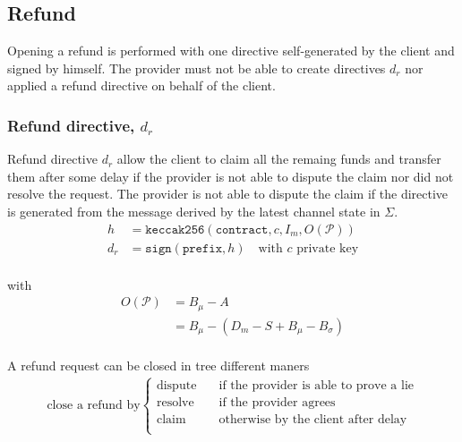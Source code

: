 \documentclass{llncs}
\begin{document}
\subsection{Refund} Opening a refund is performed with one directive self-generated by the client and signed by himself. The provider must not be able to create directives $d_r$ nor applied a refund directive on behalf of the client.

\subsubsection{Refund directive, $d_r$} Refund directive $d_r$ allow the client to claim all the remaing funds and transfer them after some delay if the provider is not able to dispute the claim nor did not resolve the request. The provider is not able to dispute the claim if the directive is generated from the message derived by the latest channel state in $\Sigma$.
\begin{equation*}
\begin{split}
    h &= \texttt{keccak256}(\texttt{contract},c,I_m,O(\mathcal{P})) \\
    d_r &= \texttt{sign}(\texttt{prefix}, h) \quad \text{with $c$ private key} \\
\end{split}
\end{equation*}

with
\begin{equation*}
\begin{split}
    O(\mathcal{P}) &= B_\mu - A \\
    &= B_\mu - (D_m - S + B_\mu - B_\sigma) \\
\end{split}
\end{equation*}

A refund request can be closed in tree different maners
\begin{equation*}
\begin{split}
    \text{close a refund by}
  \begin{cases}
      \text{dispute} & \quad \text{if the provider is able to prove a lie} \\
      \text{resolve} & \quad \text{if the provider agrees} \\
      \text{claim} & \quad \text{otherwise by the client after delay} \\
  \end{cases}
\end{split}
\end{equation*}
\end{document}
